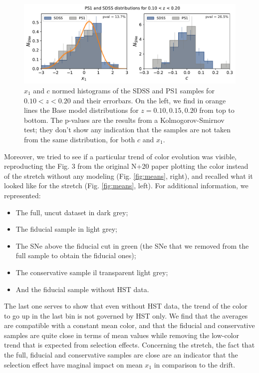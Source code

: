 \documentclass[11pt,a4paper]{paper}
\begin{document}
\vspace{30pt}

\begin{figure}[htbp!]
    \centering
    \includegraphics[width=.9\linewidth]{Answer_figures/both-cut_SDSS_PS1-010-020.pdf}
    \captionsetup{justification=centering, font=small}
    \caption{$x_1$ and $c$ normed histograms of the SDSS and PS1 samples for
        $0.10 < z < 0.20$ and their errorbars. On the left, we find in orange
        lines the Base model distributions for $z = 0.10, 0.15, 0.20$ from top
        to bottom. The p-values are the results from a Kolmogorov-Smirnov test;
    they don't show any indication that the samples are not taken from the same
distribution, for both $c$ and $x_1$.}
\label{fig:distrib}
\end{figure}

Moreover, we tried to see if a particular trend of color evolution was visible,
reproducting the Fig. 3 from the original N+20 paper plotting the color instead
of the stretch without any modeling (Fig. \ref{fig:means}, right), and recalled
what it looked like for the stretch (Fig. \ref{fig:means}, left). For additional
information, we represented:
\begin{itemize}
    \item The full, uncut dataset in dark grey;
    \item The fiducial sample in light grey;
    \item The SNe above the fiducial cut in green (the SNe that we removed from
        the full sample to obtain the fiducial ones);
    \item The conservative sample il transparent light grey;
    \item And the fiducial sample without HST data.
\end{itemize}
The last one serves to show that even without HST data, the trend of the color
to go up in the last bin is not governed by HST only. We find that the averages
are compatible with a constant mean color, and that the fiducial and
conservative samples are quite close in terms of mean values while removing the
low-color trend that is expected from selection effects. Concerning the stretch,
the fact that the full, fiducial and conservative samples are close are an
indicator that the selection effect have maginal impact on mean $x_1$ in
comparison to the drift.
\end{document}
